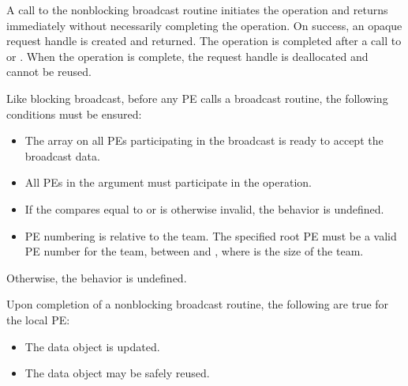 \begin{apidefinition}
{    A call to the nonblocking broadcast routine initiates the operation and returns
    immediately without necessarily completing the operation. On success,
    an opaque request handle is created and returned. The
    operation is completed after a call to  or
    . When the operation is complete, the request handle
    is deallocated and cannot be reused.

    Like blocking broadcast, before any \ac{PE} calls a broadcast routine, the following
    conditions must be ensured:
    \begin{itemize}
    \item The \dest{} array on all \acp{PE} participating in the broadcast
      is ready to accept the broadcast data.
    \item All \acp{PE} in the  argument must participate in
      the operation.
    \item If the  compares equal to  or is
      otherwise invalid, the behavior is undefined.
    \item \ac{PE} numbering is relative to the team. The specified
      root \ac{PE} must be a valid \ac{PE} number for the team,
      between  and , where  is the size of
      the team.
    \end{itemize}
    Otherwise, the behavior is undefined.

    Upon completion of a nonblocking broadcast routine, the following are true for the local
    \ac{PE}:
    \begin{itemize}
    \item The \dest{} data object is
      updated.
    \item The \source{} data object may be safely reused.
    \end{itemize}
}




\end{apidefinition}
